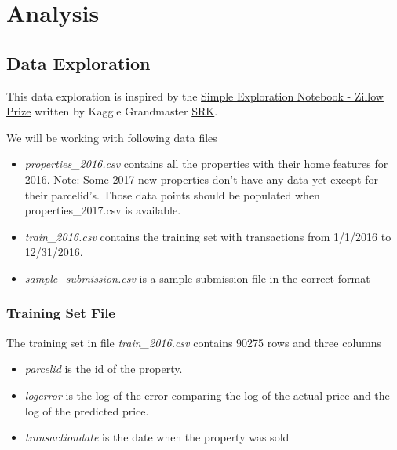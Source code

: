 \documentclass[a4paper]{article}
\begin{document}
\section{Analysis}

\subsection{Data Exploration}
This data exploration is inspired by the \href{https://www.kaggle.com/sudalairajkumar/simple-exploration-notebook-zillow-prize}{Simple Exploration Notebook - Zillow Prize} written by Kaggle Grandmaster \href{https://www.kaggle.com/sudalairajkumar}{SRK}.

We will be working with following data files
\begin{itemize}
    \item \textit{properties\_2016.csv} contains all the properties with their home features for 2016. Note: Some 2017 new
    properties don't have any data yet except for their parcelid's. Those data points should be populated when
    properties\_2017.csv is available.
    \item \textit{train\_2016.csv} contains the training set with transactions from 1/1/2016 to 12/31/2016.
    \item \textit{sample\_submission.csv} is a sample submission file in the correct format
\end{itemize}

\subsubsection{Training Set File}
The training set in file \textit{train\_2016.csv} contains 90275 rows and three columns
\begin{itemize}
    \item \textit{parcelid} is the id of the property.
    \item \textit{logerror} is the log of the error comparing the log of the actual price and the log of the predicted price.
    \item \textit{transactiondate} is the date when the property was sold
\end{itemize}
\end{document}
